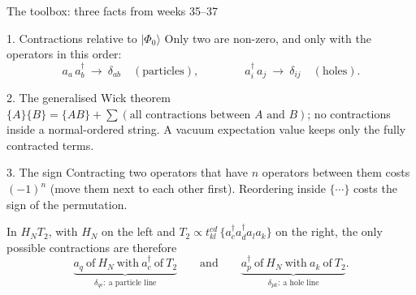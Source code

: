 \documentclass[aspectratio=169,10pt]{beamer}
\newcommand{\ket}[1]{\vert #1\rangle}
\newcommand{\cre}[1]{a_{#1}^{\dagger}}
\newcommand{\ann}[1]{a_{#1}}
\newcommand{\no}[1]{\bigl\{#1\bigr\}}
\newcommand{\ph}{\Phi_0}
\begin{document}
\begin{frame}[shrink=10]{The toolbox: three facts from weeks 35--37}
\small
\begin{block}{1. Contractions relative to $\ket{\ph}$}
Only two are non-zero, and only with the operators in this order:
\[
 \ann a\,\cre b\ \to\ \delta_{ab}\quad(\text{particles}),\qquad\qquad
 \cre i\,\ann j\ \to\ \delta_{ij}\quad(\text{holes}).
\]
\end{block}
\begin{block}{2. The generalised Wick theorem}
$\no{A}\no{B}=\no{AB}+\sum(\text{all contractions between }A\text{ and }B)$; no contractions inside a normal-ordered string. A vacuum expectation value keeps only the fully contracted terms.
\end{block}
\begin{block}{3. The sign}
Contracting two operators that have $n$ operators between them costs $(-1)^n$ (move them next to each other first). Reordering inside $\no{\cdots}$ costs the sign of the permutation.
\end{block}
In $H_NT_2$, with $H_N$ on the left and $T_2\propto t_{kl}^{cd}\,\no{\cre c\cre d\ann l\ann k}$ on the right, the only possible contractions are therefore
\[
 \underbrace{\ann q\ \text{of}\ H_N\ \text{with}\ \cre c\ \text{of}\ T_2}_{\delta_{qc}:\ \text{a particle line}}
 \qquad\text{and}\qquad
 \underbrace{\cre p\ \text{of}\ H_N\ \text{with}\ \ann k\ \text{of}\ T_2}_{\delta_{pk}:\ \text{a hole line}} .
\]
\end{frame}
\end{document}
